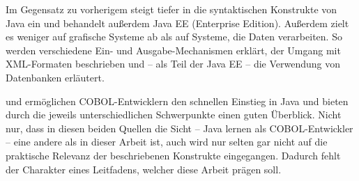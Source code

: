 Im Gegensatz zu vorherigem steigt  tiefer in die syntaktischen Konstrukte von Java ein und behandelt außerdem Java EE (Enterprise Edition). Außerdem zielt es weniger auf grafische Systeme ab als auf Systeme, die Daten verarbeiten. So werden verschiedene Ein- und Ausgabe-Mechanismen erklärt, der Umgang mit XML-Formaten beschrieben und -- als Teil der Java EE -- die Verwendung von Datenbanken erläutert.

 und  ermöglichen COBOL-Entwicklern den schnellen Einstieg in Java und bieten durch die jeweils unterschiedlichen Schwerpunkte einen guten Überblick. Nicht nur, dass in diesen beiden Quellen die Sicht -- Java lernen als COBOL-Entwickler -- eine andere als in dieser Arbeit ist, auch wird nur selten \bzw gar nicht auf die praktische Relevanz der beschriebenen Konstrukte eingegangen. Dadurch fehlt der Charakter eines Leitfadens, welcher diese Arbeit prägen soll. 